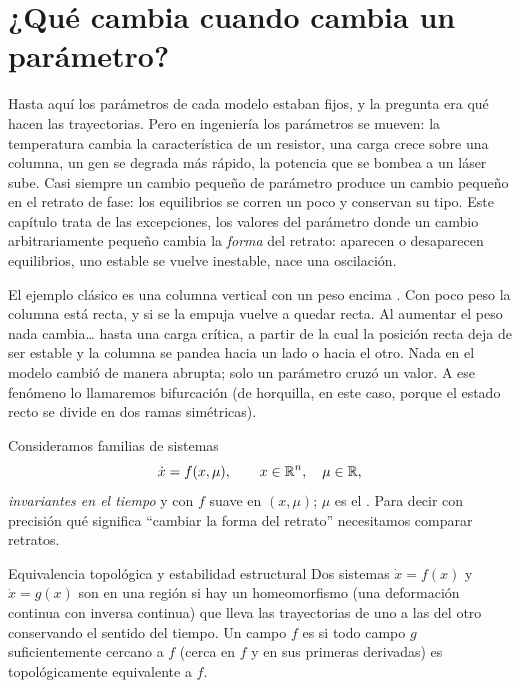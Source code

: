 \section{¿Qué cambia cuando cambia un parámetro?}
\label{sec:bf-porque}

Hasta aquí los parámetros de cada modelo estaban fijos, y la pregunta era qué hacen las trayectorias. Pero en ingeniería los parámetros se mueven: la temperatura cambia la característica de un resistor, una carga crece sobre una columna, un gen se degrada más rápido, la potencia que se bombea a un láser sube. Casi siempre un cambio pequeño de parámetro produce un cambio pequeño en el retrato de fase: los equilibrios se corren un poco y conservan su tipo. Este capítulo trata de las excepciones, los valores del parámetro donde un cambio arbitrariamente pequeño cambia la \emph{forma} del retrato: aparecen o desaparecen equilibrios, uno estable se vuelve inestable, nace una oscilación.

El ejemplo clásico es una columna vertical con un peso encima \citep[\S3.0]{Str15}. Con poco peso la columna está recta, y si se la empuja vuelve a quedar recta. Al aumentar el peso nada cambia\dots{} hasta una carga crítica, a partir de la cual la posición recta deja de ser estable y la columna se pandea hacia un lado o hacia el otro. Nada en el modelo cambió de manera abrupta; solo un parámetro cruzó un valor. A ese fenómeno lo llamaremos bifurcación (de horquilla, en este caso, porque el estado recto se divide en dos ramas simétricas).

Consideramos familias de sistemas
\begin{equation}
  \dot x=f(x,\mu),\qquad x\in\mathbb{R}^n,\quad \mu\in\mathbb{R} ,
  \label{eq:bf-familia}
\end{equation}
\emph{invariantes en el tiempo} y con $f$ suave en $(x,\mu)$; $\mu$ es el . Para decir con precisión qué significa ``cambiar la forma del retrato'' necesitamos comparar retratos.

\begin{definicion}[label=def:bf-equivalencia]{Equivalencia topológica y estabilidad estructural}
Dos sistemas $\dot x=f(x)$ y $\dot x=g(x)$ son  en una región si hay un homeomorfismo (una deformación continua con inversa continua) que lleva las trayectorias de uno a las del otro conservando el sentido del tiempo. Un campo $f$ es  si todo campo $g$ suficientemente cercano a $f$ (cerca en $f$ y en sus primeras derivadas) es topológicamente equivalente a $f$.
\end{definicion}

